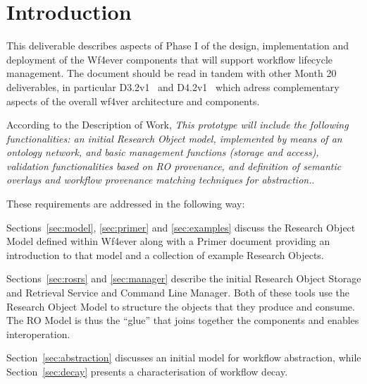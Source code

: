\section{Introduction}

This deliverable describes aspects of Phase I of the design,
implementation and deployment of the Wf4ever components that will
support workflow lifecycle management. The document should be read in
tandem with other Month 20 deliverables, in particular D3.2v1~\cite{D3.2v1} and D4.2v1~\cite{D4.2v1} which
adress complementary aspects of the overall wf4ver architecture and
components. 

According to the Description of Work, \emph{This prototype will
  include the following functionalities: an initial Research Object
  model, implemented by means of an ontology network, and basic
  management functions (storage and access), validation
  functionalities based on RO provenance, and definition of semantic
  overlays and workflow provenance matching techniques for
  abstraction.}. 

These requirements are addressed in the following way:

Sections~\ref{sec:model}, \ref{sec:primer} and \ref{sec:examples}
discuss the Research Object Model defined within Wf4ever along with a
Primer document providing an introduction to that model and a
collection of example Research Objects. 

Sections~\ref{sec:rosrs} and \ref{sec:manager} describe the initial
Research Object Storage and Retrieval Service and Command Line
Manager. Both of these tools use the Research Object Model to
structure the objects that they produce and consume. The RO Model is
thus the ``glue'' that joins together the components and enables
interoperation. 

Section~\ref{sec:abstraction} discusses an initial model for workflow
abstraction, while Section~\ref{sec:decay} presents a characterisation
of workflow decay. 
